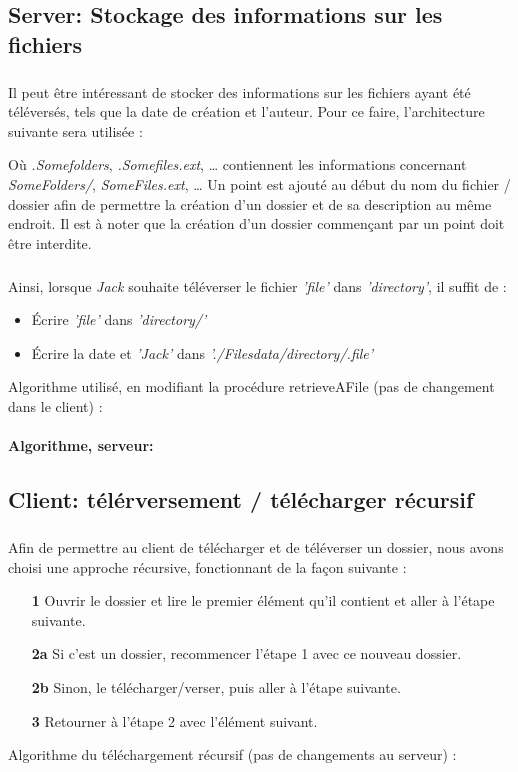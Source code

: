 \documentclass[12pt,a4paper,twoside]{article}
\begin{document}
		\subsection{Server: Stockage des informations sur les fichiers} %
			\subparagraph*{}
				Il peut être intéressant de stocker des informations sur les fichiers ayant été téléversés, tels que la date de création et l'auteur.
				Pour ce faire, l'architecture suivante sera utilisée :
				\begin{samepage}
					
				\end{samepage}
				Où \textit{.Somefolders}, \textit{.Somefiles.ext}, \ldots{} contiennent les informations concernant \textit{SomeFolders/}, \textit{SomeFiles.ext}, \ldots{}
				Un point est ajouté au début du nom du fichier / dossier afin de permettre la création d'un dossier et de sa description au même endroit. Il est à noter que la création d'un dossier commençant par un point doit être interdite.
			\subparagraph*{}
				Ainsi, lorsque \textit{Jack} souhaite téléverser le fichier \textit{'file'} dans \textit{'directory'}, il suffit de :
				\begin{itemize}
					\item{} Écrire \textit{'file'} dans \textit{'directory/'}
					\item{} Écrire la date et \textit{'Jack'} dans \textit{'./Filesdata/directory/.file'}
				\end{itemize}
				Algorithme utilisé, en modifiant la procédure retrieveAFile (pas de changement dans le client) :
			\paragraph*{Algorithme, serveur:}
				
				
		\subsection{Client: télérversement / télécharger récursif} %
			\subparagraph*{}
				Afin de permettre au client de télécharger et de téléverser un dossier, nous avons choisi une approche récursive, fonctionnant de la façon suivante :
				\begin{itemize}
					\item[\textbf{1 }]{} Ouvrir le dossier et lire le premier élément qu'il contient et aller à l'étape suivante.
					\item[\textbf{2a}]{} Si c'est un dossier, recommencer l'étape 1 avec ce nouveau dossier.
					\item[\textbf{2b}]{} Sinon, le télécharger/verser, puis aller à l'étape suivante.
					\item[\textbf{3 }]{} Retourner à l'étape 2 avec l'élément suivant.
				\end{itemize}
				Algorithme du téléchargement récursif (pas de changements au serveur) :
\end{document}
